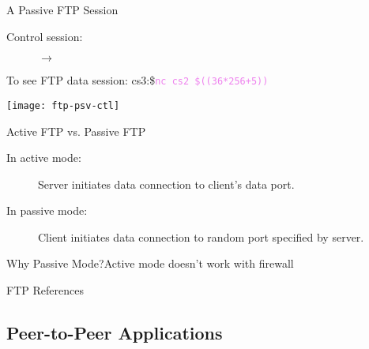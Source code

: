             
\begin{frame}{A Passive FTP Session}
  \begin{minipage}{.4\linewidth}
    \begin{description}
    \item[Control session:] $\longrightarrow$
    \end{description}
    \begin{iblock}{To see FTP data session:}
      {\ttfamily\small cs3:\$}\quad\textcolor{violet}{\texttt{nc cs2 \$((36*256+5))}}
    \end{iblock}
  \end{minipage}\hfill
  \begin{minipage}{.6\linewidth}
    \texttt{[image: ftp-psv-ctl]}
  \end{minipage}
\end{frame}

\begin{frame}{Active FTP vs. Passive FTP}
  \begin{description}
  \item[In active mode:] Server initiates data connection to client's data port.
  \item[In passive mode:] Client initiates data connection to random port specified by
    server.
  \end{description}
\end{frame}

\begin{frame}{Why Passive Mode?}{Active mode doesn't work with firewall}
  \centering
  \mode<beamer>{ \texttt{[image: ftp-firewall]} }%
\end{frame}

\begin{frame}{FTP References}
  \begin{refsection}
    \nocite{wiki:ftp, rfc959,rfc1579}
    \printbibliography[heading=none]
  \end{refsection}
\end{frame}

\subsection{Peer-to-Peer Applications}

